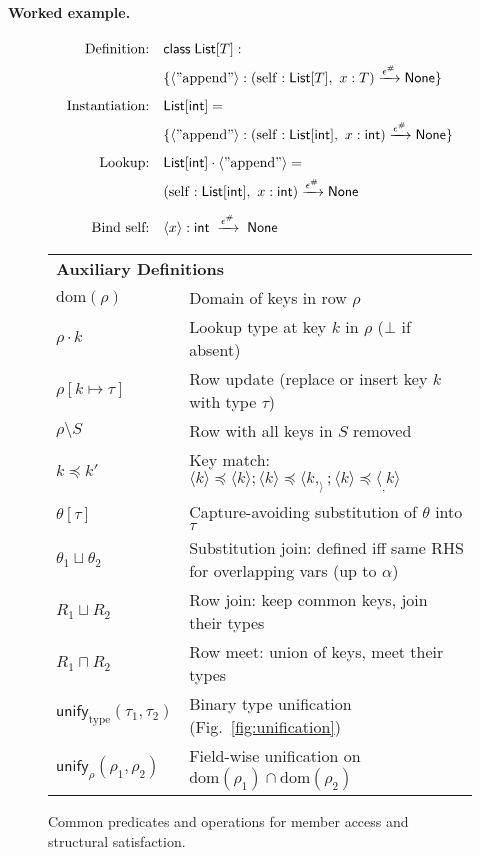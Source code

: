 \paragraph{Worked example.}
\[
\begin{aligned}
\text{Definition:} \quad & \mathsf{class}\; \mathsf{List}[T] :
\\ & \{\langle \mathrm{"append"} \rangle : (\mathrm{self}:\mathsf{List}[T],\ x:T) \xrightarrow{\epsilon^\#} \mathsf{None} \} \\[0.5em]
\text{Instantiation:} \quad & \mathsf{List}[\mathsf{int}] =
\\ & \{\langle \mathrm{"append"} \rangle : (\mathrm{self}:\mathsf{List}[\mathsf{int}],\ x:\mathsf{int}) \xrightarrow{\epsilon^\#} \mathsf{None} \} \\[0.5em]
\text{Lookup:} \quad & \mathsf{List}[\mathsf{int}] \cdot \langle \mathrm{"append"} \rangle =
\\ & (\mathrm{self}:\mathsf{List}[\mathsf{int}],\ x:\mathsf{int}) \xrightarrow{\epsilon^\#} \mathsf{None} \\[0.5em]
\text{Bind self:} \quad & \langle x\rangle:\mathsf{int} \;\xrightarrow{\epsilon^\#}\; \mathsf{None}
\end{aligned}
\]

\begin{figure}[t]
\centering
\renewcommand{\arraystretch}{1.2}
\begin{tabular}{l l}
\multicolumn{2}{l}{\textbf{Auxiliary Definitions}} \\[0.3em]
$\mathrm{dom}(\rho)$ & Domain of keys in row $\rho$ \\
$\rho \cdot k$ & Lookup type at key $k$ in $\rho$ ($\bot$ if absent) \\
$\rho[k \mapsto \tau]$ & Row update (replace or insert key $k$ with type $\tau$) \\
$\rho \setminus S$ & Row with all keys in $S$ removed \\
$k \preccurlyeq k'$ & Key match: $\langle k \rangle \preccurlyeq \langle k \rangle; \langle k \rangle \preccurlyeq \langle k, _ \rangle; \langle k \rangle \preccurlyeq \langle _, k \rangle$ \\
$\theta[\tau]$ & Capture-avoiding substitution of $\theta$ into $\tau$ \\
$\theta_1 \sqcup \theta_2$ & Substitution join: defined iff same RHS for overlapping vars (up to $\alpha$) \\
$R_1 \sqcup R_2$ & Row join: keep common keys, join their types \\
$R_1 \sqcap R_2$ & Row meet: union of keys, meet their types \\
$\mathsf{unify}_{\mathrm{type}}(\tau_1,\tau_2)$ & Binary type unification (Fig.~\ref{fig:unification}) \\
$\mathsf{unify}_{\rho}(\rho_1,\rho_2)$ & Field-wise unification on $\mathrm{dom}(\rho_1) \cap \mathrm{dom}(\rho_2)$
\end{tabular}
\caption{Common predicates and operations for member access and structural satisfaction.}
\label{fig:auxiliary-defs}
\end{figure}

